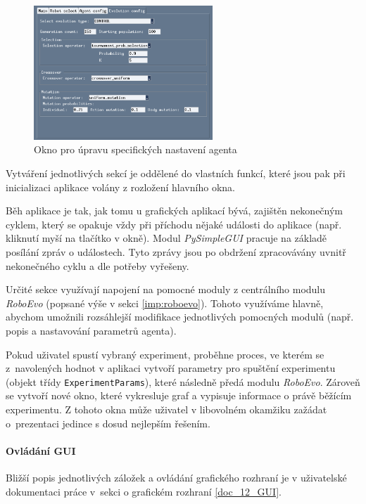 \begin{figure}[!htb]
    \centering
    \includegraphics[width=0.6\textwidth]{../img/GUI_evo_tab.jpg}
    \caption{Okno pro úpravu specifických nastavení agenta}
    \label{imp:fig:GUI_evo}
\end{figure}


Vytváření jednotlivých sekcí je oddělené do vlastních funkcí, které jsou pak
při inicializaci aplikace volány z rozložení hlavního okna.

Běh aplikace je tak, jak tomu u grafických aplikací bývá, zajištěn nekonečným
cyklem, který se opakuje vždy při příchodu nějaké události do aplikace (např.
kliknutí myší na tlačítko v okně). Modul \emph{PySimpleGUI} pracuje na základě
posílání zpráv o událostech. Tyto zprávy jsou po obdržení zpracovávány uvnitř
nekonečného cyklu a dle potřeby vyřešeny.

Určité sekce využívají napojení na pomocné moduly z centrálního modulu
\emph{RoboEvo} (popsané výše v sekci \ref{imp:roboevo}). Tohoto využíváme
hlavně, abychom umožnili rozsáhlejší modifikace jednotlivých pomocných modulů
(např. popis a nastavování parametrů agenta).

Pokud uživatel spustí vybraný experiment, proběhne proces, ve kterém se
z~navolených hodnot v aplikaci vytvoří parametry pro spuštění experimentu
(objekt třídy \texttt{ExperimentParams}), které následně předá modulu
\emph{RoboEvo}. Zároveň se vytvoří nové okno, které vykresluje graf a vypisuje
informace o právě běžícím experimentu. Z tohoto okna může uživatel v libovolném
okamžiku zažádat o~prezentaci jedince s dosud nejlepším řešením.

\paragraph{Ovládání GUI}
Bližší popis jednotlivých záložek a ovládání grafického rozhraní je v
uživatelské dokumentaci práce v~sekci o grafickém rozhraní \ref{doc_12_GUI}.

